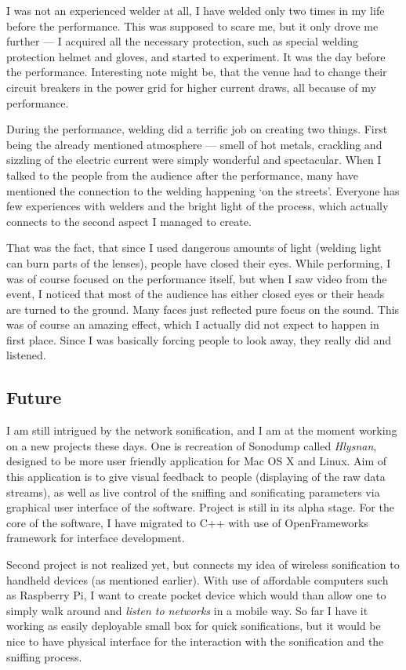 \documentclass[12pt,a4paper,oneside]{report}
\begin{document}
I was not an experienced welder at all, I have welded only two times in my life before the performance. This was supposed to scare me, but it only drove me further --- I acquired all the necessary protection, such as special welding protection helmet and gloves, and started to experiment. It was the day before the performance. Interesting note might be, that the venue had to change their circuit breakers in the power grid for higher current draws, all because of my performance.

During the performance, welding did a terrific job on creating two things. First being the already mentioned atmosphere --- smell of hot metals, crackling and sizzling of the electric current were simply wonderful and spectacular. When I talked to the people from the audience after the performance, many have mentioned the connection to the welding happening `on the streets'. Everyone has few experiences with welders and the bright light of the process, which actually connects to the second aspect I managed to create. 

That was the fact, that since I used dangerous amounts of light (welding light can burn parts of the lenses), people have closed their eyes. While performing, I was of course focused on the performance itself, but when I saw video from the event, I noticed that most of the audience has either closed eyes or their heads are turned to the ground. Many faces just reflected pure focus on the sound. This was of course an amazing effect, which I actually did not expect to happen in first place. Since I was basically forcing people to look away, they really did and listened.

\subsection{Future}
I am still intrigued by the network sonification, and I am at the moment working on a new projects these days. One is recreation of Sonodump called \textit{Hlysnan}, designed to be more user friendly application for Mac OS X and Linux. Aim of this application is to give visual feedback to people (displaying of the raw data streams), as well as live control of the sniffing and sonificating parameters via graphical user interface of the software. Project is still in its alpha stage. For the core of the software, I have migrated to C++ with use of OpenFrameworks framework for interface development.

Second project is not realized yet, but connects my idea of wireless sonification to handheld devices (as mentioned earlier). With use of affordable computers such as Raspberry Pi, I want to create pocket device which would than allow one to simply walk around and \emph{listen to networks} in a mobile way. So far I have it working as easily deployable small box for quick sonifications, but it would be nice to have physical interface for the interaction with the sonification and the sniffing process.
\end{document}
